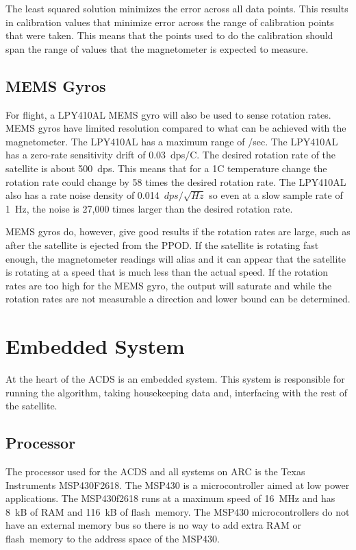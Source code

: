 The least squared solution minimizes the error across all data points. This results in calibration values that minimize error across the range of calibration points that were taken. This means that the points used to do the calibration should span the range of values that the magnetometer is expected to measure. 

\subsection{\acs*{MEMS} Gyros}

For flight, a LPY410AL \ac{MEMS} gyro will also be used to sense rotation rates. \ac{MEMS} gyros have limited resolution compared to what can be achieved with the magnetometer. The LPY410AL has a maximum range of \textdegree /sec. The LPY410AL has a zero-rate sensitivity drift of 0.03~dps/\textdegree C. The desired rotation rate of the satellite is about 500~\textmu dps. This means that for a 1\textdegree C temperature change the rotation rate could change by 58 times the desired rotation rate. The LPY410AL also has a rate noise density of 0.014~$\unit{dps}{/}\sqrt{\unit{Hz}}$ so even at a slow sample rate of 1~Hz, the noise is 27,000 times larger than the desired rotation rate.

\ac{MEMS} gyros do, however, give good results if the rotation rates are large, such as after the satellite is ejected from the \ac{PPOD}. If the satellite is rotating fast enough, the magnetometer readings will alias and it can appear that the satellite is rotating at a speed that is much less than the actual speed. If the rotation rates are too high for the \ac{MEMS} gyro, the output will saturate and while the rotation rates are not measurable a direction and lower bound can be determined.


\section{Embedded System}

At the heart of the \ac{ACDS} is an embedded system. This system is responsible for running the algorithm, taking housekeeping data and, interfacing with the rest of the satellite.

\subsection{Processor}

The processor used for the \ac{ACDS} and all systems on \ac{ARC} is the Texas Instruments MSP430F2618. The MSP430 is a microcontroller aimed at low power applications. The MSP430f2618 runs at a maximum speed of 16~MHz and has 8~kB of \ac{RAM} and 116~kB of flash~memory. The MSP430 microcontrollers do not have an external memory bus so there is no way to add extra \ac{RAM} or flash~memory to the address space of the MSP430.

